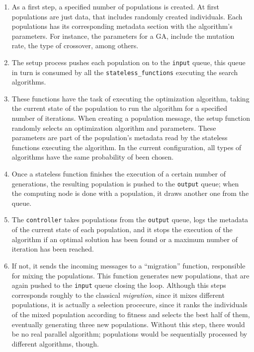 \documentclass[runningheads]{llncs}
\begin{document}
\begin{enumerate}

\item As a first step, a specified number of populations is created. 
At first populations are just data, that includes randomly created individuals.
Each populations has its corresponding metadata section with the algorithm's parameters.
For instance, the parameters for a GA, include the mutation rate, the type of crossover, among others.

\item The setup process pushes each population on to the \texttt{input}
queue, this queue in turn is consumed by all the \texttt{stateless\_functions} executing 
the search algorithms.

\item These functions have the task of executing the optimization algorithm, taking the 
current state of the population to run the algorithm for a specified number of
iterations. When creating a population message, the setup function randomly
selects an optimization algorithm and parameters. These parameters
are part of the population's metadata read by the stateless
functions executing the algorithm. In the current configuration, all
types of algorithms have the same probability of been chosen. %

\item Once a stateless function finishes the execution of a certain number of
  generations, the resulting population is pushed to 
the \texttt{output} queue; when the computing node is done with a population, it draws another one from the
queue.

\item The \texttt{controller} takes populations from the \texttt{output} queue,
logs the metadata of the current state of each population, and it stops the execution
of the algorithm if an optimal solution has been found or a maximum number of iteration
has been reached.

\item If not, it sends the incoming messages to a ``migration'' function,
  responsible for mixing the populations. This function generates new populations,
  that are again pushed to the \texttt{input} queue closing the loop.
  Although this steps corresponds roughly to the classical
{\em migration}, since it mixes different populations, it is actually
a selection procecure, since it ranks the individuals of the mixed
population according to fitness and selects the best half of them,
eventually generating three new populations. Without this step, there
would be no real parallel algorithm; populations would be sequentially
processed by different algorithms, though.

\end{enumerate}
\end{document}
